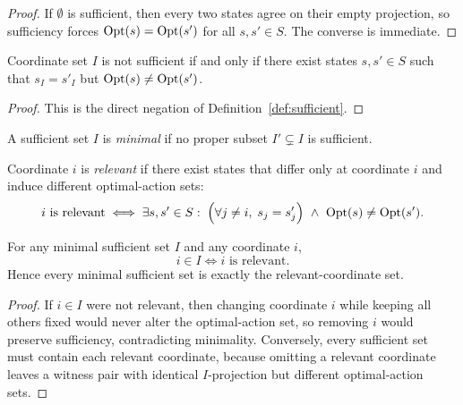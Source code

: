 \begin{proof}
If $\emptyset$ is sufficient, then every two states agree on their empty projection, so sufficiency forces $\mathrm{Opt}(s)=\mathrm{Opt}(s')$ for all $s,s' \in S$. The converse is immediate.
\end{proof}

\begin{proposition}\label{prop:insufficiency-counterexample}
Coordinate set $I$ is not sufficient if and only if there exist states $s,s' \in S$ such that $s_I=s'_I$ but $\mathrm{Opt}(s)\neq\mathrm{Opt}(s')$.
\end{proposition}


\begin{proof}
This is the direct negation of Definition~\ref{def:sufficient}.
\end{proof}

\begin{definition}\label{def:minimal-sufficient}
A sufficient set $I$ is \emph{minimal} if no proper subset $I' \subsetneq I$ is sufficient.
\end{definition}

\begin{definition}\label{def:relevant}
Coordinate $i$ is \emph{relevant} if there exist states that differ only at coordinate $i$ and induce different optimal-action sets:
\[
i \text{ is relevant}
\iff
\exists s,s' \in S:\;
\Big(\forall j \neq i,\; s_j=s'_j\Big)
\ \wedge\
\mathrm{Opt}(s)\neq\mathrm{Opt}(s').
\]
\end{definition}

\begin{proposition}\label{prop:minimal-relevant-equiv}
For any minimal sufficient set $I$ and any coordinate $i$,
\[
i \in I \iff i \text{ is relevant}.
\]
Hence every minimal sufficient set is exactly the relevant-coordinate set.
\end{proposition}


\begin{proof}
If $i \in I$ were not relevant, then changing coordinate $i$ while keeping all others fixed would never alter the optimal-action set, so removing $i$ would preserve sufficiency, contradicting minimality. Conversely, every sufficient set must contain each relevant coordinate, because omitting a relevant coordinate leaves a witness pair with identical $I$-projection but different optimal-action sets.
\end{proof}


